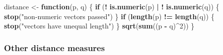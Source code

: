 \documentclass[]{book}
\newenvironment{Shaded}{\begin{snugshade}}{\end{snugshade}}
\newcommand{\ControlFlowTok}[1]{\textcolor[rgb]{0.13,0.29,0.53}{\textbf{#1}}}
\newcommand{\DecValTok}[1]{\textcolor[rgb]{0.00,0.00,0.81}{#1}}
\newcommand{\KeywordTok}[1]{\textcolor[rgb]{0.13,0.29,0.53}{\textbf{#1}}}
\newcommand{\NormalTok}[1]{#1}
\newcommand{\OperatorTok}[1]{\textcolor[rgb]{0.81,0.36,0.00}{\textbf{#1}}}
\newcommand{\StringTok}[1]{\textcolor[rgb]{0.31,0.60,0.02}{#1}}
\begin{document}
\begin{Shaded}
\begin{Highlighting}[]
\NormalTok{distance <-}\StringTok{ }\ControlFlowTok{function}\NormalTok{(p, q) \{}
    \ControlFlowTok{if}\NormalTok{ (}\OperatorTok{!}\StringTok{ }\KeywordTok{is.numeric}\NormalTok{(p) }\OperatorTok{|}\StringTok{ }\OperatorTok{!}\StringTok{ }\KeywordTok{is.numeric}\NormalTok{(q)) \{}
        \KeywordTok{stop}\NormalTok{(}\StringTok{"non-numeric vectors passed"}\NormalTok{)}
\NormalTok{    \}}
    \ControlFlowTok{if}\NormalTok{ (}\KeywordTok{length}\NormalTok{(p) }\OperatorTok{!=}\StringTok{ }\KeywordTok{length}\NormalTok{(q)) \{}
        \KeywordTok{stop}\NormalTok{(}\StringTok{"vectors have unequal length"}\NormalTok{)}
\NormalTok{    \}}
    \KeywordTok{sqrt}\NormalTok{(}\KeywordTok{sum}\NormalTok{((p }\OperatorTok{-}\StringTok{ }\NormalTok{q)}\OperatorTok{^}\DecValTok{2}\NormalTok{))}
\NormalTok{\}}
\end{Highlighting}
\end{Shaded}

\hypertarget{other-distance-measures-1}{%
\subsubsection*{Other distance measures}\label{other-distance-measures-1}}
\end{document}
